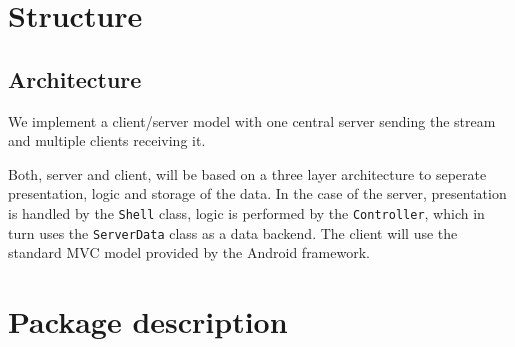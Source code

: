 \documentclass[a4paper,10pt]{scrartcl}
\begin{document}
\section{Structure}
\subsection{Architecture}

We implement a client/server model with one central server sending the stream and multiple clients
receiving it.



Both, server and client, will be based on a three layer architecture to seperate presentation, logic
and storage of the data.
In the case of the server, presentation is handled by the \lstinline|Shell| class, logic is
performed by the \lstinline|Controller|, which in turn uses the \lstinline|ServerData| class
as a data backend.
The client will use the standard MVC model provided by the Android framework.



\section{Package description}

\end{document}

